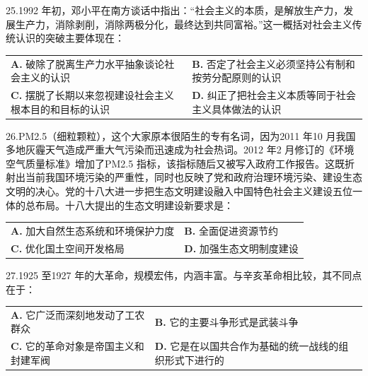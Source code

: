 \documentclass[UTF8,11pt]{ctexart}
\begin{document}
25.1992 年初，邓小平在南方谈话中指出：“社会主义的本质，是解放生产力，发展生产力，消除剥削，消除两极分化，最终达到共同富裕。”这一概括对社会主义传统认识的突破主要体现在：


\begin{center}\begin{tabular}{>{\raggedright\arraybackslash}p{\dimexpr(\linewidth-4\tabcolsep)/2\relax}>{\raggedright\arraybackslash}p{\dimexpr(\linewidth-4\tabcolsep)/2\relax}}
\textbf{A.} 破除了脱离生产力水平抽象谈论社会主义的认识 & \textbf{B.} 否定了社会主义必须坚持公有制和按劳分配原则的认识\\[.35em]
\textbf{C.} 摆脱了长期以来忽视建设社会主义根本目的和目标的认识 & \textbf{D.} 纠正了把社会主义本质等同于社会主义具体做法的认识\\[.35em]\end{tabular}\end{center}

26.PM2.5（细粒颗粒），这个大家原本很陌生的专有名词，因为2011 年10 月我国多地灰霾天气造成严重大气污染而迅速成为社会热词。2012 年2 月修订的《环境空气质量标准》增加了PM2.5 指标，该指标随后又被写入政府工作报告。这既折射出当前我国环境污染的严重性，同时也反映了党和政府治理环境污染、建设生态文明的决心。党的十八大进一步把生态文明建设融入中国特色社会主义建设五位一体的总布局。十八大提出的生态文明建设新要求是：


\begin{center}\begin{tabular}{>{\raggedright\arraybackslash}p{\dimexpr(\linewidth-4\tabcolsep)/2\relax}>{\raggedright\arraybackslash}p{\dimexpr(\linewidth-4\tabcolsep)/2\relax}}
\textbf{A.} 加大自然生态系统和环境保护力度 & \textbf{B.} 全面促进资源节约\\[.35em]
\textbf{C.} 优化国土空间开发格局 & \textbf{D.} 加强生态文明制度建设\\[.35em]\end{tabular}\end{center}

27.1925 至1927 年的大革命，规模宏伟，内涵丰富。与辛亥革命相比较，其不同点在于：


\begin{center}\begin{tabular}{>{\raggedright\arraybackslash}p{\dimexpr(\linewidth-4\tabcolsep)/2\relax}>{\raggedright\arraybackslash}p{\dimexpr(\linewidth-4\tabcolsep)/2\relax}}
\textbf{A.} 它广泛而深刻地发动了工农群众 & \textbf{B.} 它的主要斗争形式是武装斗争\\[.35em]
\textbf{C.} 它的革命对象是帝国主义和封建军阀 & \textbf{D.} 它是在以国共合作为基础的统一战线的组织形式下进行的\\[.35em]\end{tabular}\end{center}
\end{document}

